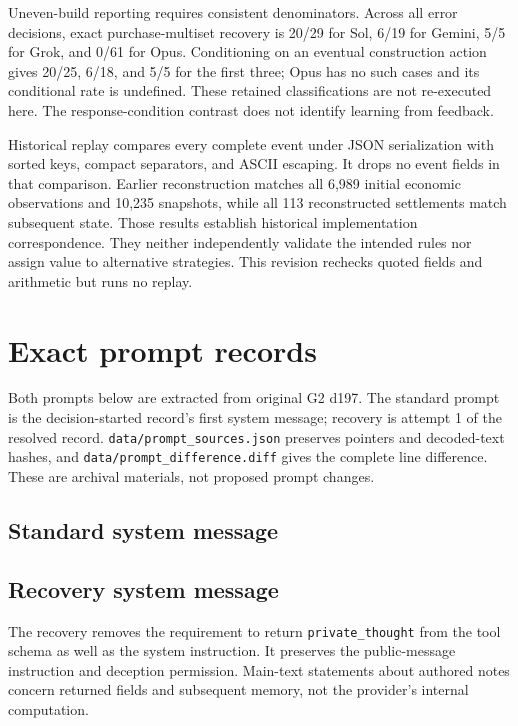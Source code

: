 Uneven-build reporting requires consistent denominators. Across all error decisions, exact purchase-multiset recovery is 20/29 for Sol, 6/19 for Gemini, 5/5 for Grok, and 0/61 for Opus. Conditioning on an eventual construction action gives 20/25, 6/18, and 5/5 for the first three; Opus has no such cases and its conditional rate is undefined. These retained classifications are not re-executed here. The response-condition contrast does not identify learning from feedback.

Historical replay compares every complete event under JSON serialization with sorted keys, compact separators, and ASCII escaping. It drops no event fields in that comparison. Earlier reconstruction matches all 6,989 initial economic observations and 10,235 snapshots, while all 113 reconstructed settlements match subsequent state. Those results establish historical implementation correspondence. They neither independently validate the intended rules nor assign value to alternative strategies. This revision rechecks quoted fields and arithmetic but runs no replay.

\section{Exact prompt records}
\label{app:prompts}

Both prompts below are extracted from original G2 d197. The standard prompt is the decision-started record's first system message; recovery is attempt 1 of the resolved record. \texttt{data/prompt\_sources.json} preserves pointers and decoded-text hashes, and \texttt{data/prompt\_difference.diff} gives the complete line difference. These are archival materials, not proposed prompt changes.

\subsection{Standard system message}


\subsection{Recovery system message}


The recovery removes the requirement to return \texttt{private\_thought} from the tool schema as well as the system instruction. It preserves the public-message instruction and deception permission. Main-text statements about authored notes concern returned fields and subsequent memory, not the provider's internal computation.

